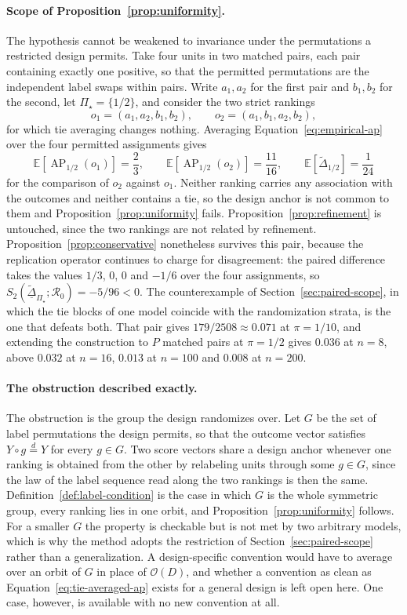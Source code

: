 \documentclass[11pt]{article}
\newcommand{\AP}{\operatorname{AP}}
\newcommand{\Regime}{\mathcal{R}}
\newcommand{\PSet}{\Pi_\star}
\newcommand{\E}{\mathbb{E}}
\newcommand{\Dta}{\widetilde{\Delta}}
\newcommand{\RobDta}{\underline{\widetilde{\Delta}}_{\PSet}}
\theoremstyle{remark}
\begin{document}
\paragraph{Scope of Proposition~\ref{prop:uniformity}.}
The hypothesis cannot be weakened to invariance under the permutations a restricted design permits. Take four units in two matched pairs, each pair containing exactly one positive, so that the permitted permutations are the independent label swaps within pairs. Write $a_1,a_2$ for the first pair and $b_1,b_2$ for the second, let $\PSet=\{1/2\}$, and consider the two strict rankings
\[
o_1=(a_1,a_2,b_1,b_2),
\qquad
o_2=(a_1,b_1,a_2,b_2),
\]
for which tie averaging changes nothing. Averaging Equation~\eqref{eq:empirical-ap} over the four permitted assignments gives
\[
\E\left[\AP_{1/2}(o_1)\right]=\frac23,
\qquad
\E\left[\AP_{1/2}(o_2)\right]=\frac{11}{16},
\qquad
\E\left[\Dta_{1/2}\right]=\frac{1}{24}
\]
for the comparison of $o_2$ against $o_1$. Neither ranking carries any association with the outcomes and neither contains a tie, so the design anchor is not common to them and Proposition~\ref{prop:uniformity} fails. Proposition~\ref{prop:refinement} is untouched, since the two rankings are not related by refinement. Proposition~\ref{prop:conservative} nonetheless survives this pair, because the replication operator continues to charge for disagreement: the paired difference takes the values $1/3$, $0$, $0$ and $-1/6$ over the four assignments, so $S_2(\RobDta;\Regime_0)=-5/96<0$. The counterexample of Section~\ref{sec:paired-scope}, in which the tie blocks of one model coincide with the randomization strata, is the one that defeats both. That pair gives $179/2508\approx0.071$ at $\pi=1/10$, and extending the construction to $P$ matched pairs at $\pi=1/2$ gives $0.036$ at $n=8$, above $0.032$ at $n=16$, $0.013$ at $n=100$ and $0.008$ at $n=200$.

\paragraph{The obstruction described exactly.}
The obstruction is the group the design randomizes over. Let $G$ be the set of label permutations the design permits, so that the outcome vector satisfies $Y\circ g\overset{d}{=}Y$ for every $g\in G$. Two score vectors share a design anchor whenever one ranking is obtained from the other by relabeling units through some $g\in G$, since the law of the label sequence read along the two rankings is then the same. Definition~\ref{def:label-condition} is the case in which $G$ is the whole symmetric group, every ranking lies in one orbit, and Proposition~\ref{prop:uniformity} follows. For a smaller $G$ the property is checkable but is not met by two arbitrary models, which is why the method adopts the restriction of Section~\ref{sec:paired-scope} rather than a generalization. A design-specific convention would have to average over an orbit of $G$ in place of $\mathcal{O}(D)$, and whether a convention as clean as Equation~\eqref{eq:tie-averaged-ap} exists for a general design is left open here. One case, however, is available with no new convention at all.
\end{document}
